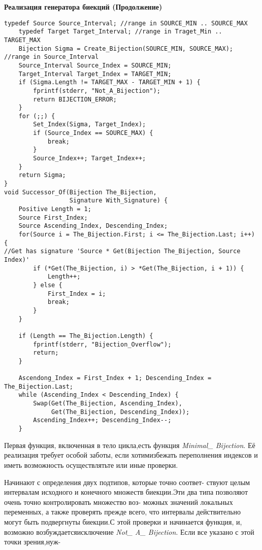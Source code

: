 \documentclass{mai_book}
\begin{document}
\newpage
\begin{center}
\small\textbf{Реализация генератора биекций (Продолжение)}
\end{center}
\dotfill

\begin{lstlisting}[mathescape=true]
    typedef Source Source_Interval; //range in SOURCE_MIN .. SOURCE_MAX
    typedef Target Target_Interval; //range in Traget_Min .. TARGET_MAX
    Bijection Sigma = Create_Bijection(SOURCE_MIN, SOURCE_MAX); //range in Source_Interval
    Source_Interval Source_Index = SOURCE_MIN;
    Target_Interval Target_Index = TARGET_MIN;
    if (Sigma.Length != TARGET_MAX - TARGET_MIN + 1) {
        fprintf(stderr, "Not_A_Bijection");
        return BIJECTION_ERROR;
    }
    for (;;) {
        Set_Index(Sigma, Target_Index);
        if (Source_Index == SOURCE_MAX) {
            break;
        }
        Source_Index++; Target_Index++;
    }
    return Sigma;
}
void Successor_Of(Bijection The_Bijection, 
                  Signature With_Signature) {
    Positive Length = 1;
    Source First_Index;
    Source Ascending_Index, Descending_Index;
    for(Source i = The_Bijection.First; i <= The_Bijection.Last; i++) {
//Get has signature 'Source * Get(Bijection The_Bijection, Source Index)'
        if (*Get(The_Bijection, i) > *Get(The_Bijection, i + 1)) {
            Length++;
        } else {
            First_Index = i;
            break;
        }
    }
    
    if (Length == The_Bijection.Length) {
        fprintf(stderr, "Bijection_Overflow");
        return;
    }
    
    Ascendong_Index = First_Index + 1; Descending_Index = The_Bijection.Last;
    while (Ascending_Index < Descending_Index) {
        Swap(Get(The_Bijection, Ascending_Index), 
             Get(The_Bijection, Descending_Index));
        Ascending_Index++; Descending_Index--;
    }   
\end{lstlisting}

Первая функция, включенная в тело цикла,есть функция
\textit{Minimal\_ Bijection}. Её реализация требует особой заботы, если хотим\linebreak избежать переполнения индексов и иметь возможность осуществлять\linebreak те или иные проверки.

Начинают с определения двух подтипов, которые точно соответ- \linebreak ствуют целым интервалам исходного и конечного множеств биекции.\linebreak Эти два типа позволяют очень точно контролировать множество воз- \linebreak можных значений локальных переменных, а также проверять прежде \linebreak всего, что интервалы действительно могут быть подвергнуты биекции.\linebreak С этой проверки и начинается функция, и, возможно возбуждается\linebreak исключение \textit{Not\_ A\_ Bijection}. Если все указано с этой точки зрения,нуж-
\end{document}
